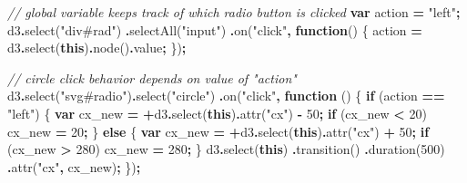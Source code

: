 \documentclass[
  openany]{book}
\newenvironment{Shaded}{\begin{snugshade}}{\end{snugshade}}
\newcommand{\AttributeTok}[1]{\textcolor[rgb]{0.77,0.63,0.00}{#1}}
\newcommand{\CommentTok}[1]{\textcolor[rgb]{0.56,0.35,0.01}{\textit{#1}}}
\newcommand{\ControlFlowTok}[1]{\textcolor[rgb]{0.13,0.29,0.53}{\textbf{#1}}}
\newcommand{\DecValTok}[1]{\textcolor[rgb]{0.00,0.00,0.81}{#1}}
\newcommand{\FunctionTok}[1]{\textcolor[rgb]{0.00,0.00,0.00}{#1}}
\newcommand{\KeywordTok}[1]{\textcolor[rgb]{0.13,0.29,0.53}{\textbf{#1}}}
\newcommand{\NormalTok}[1]{#1}
\newcommand{\OperatorTok}[1]{\textcolor[rgb]{0.81,0.36,0.00}{\textbf{#1}}}
\newcommand{\StringTok}[1]{\textcolor[rgb]{0.31,0.60,0.02}{#1}}
\begin{document}
\begin{Shaded}
\begin{Highlighting}[]
\CommentTok{// global variable keeps track of which radio button is clicked}
\KeywordTok{var}\NormalTok{ action }\OperatorTok{=} \StringTok{"left"}\OperatorTok{;}
\NormalTok{d3}\OperatorTok{.}\FunctionTok{select}\NormalTok{(}\StringTok{"div\#rad"}\NormalTok{)}
  \OperatorTok{.}\FunctionTok{selectAll}\NormalTok{(}\StringTok{"input"}\NormalTok{)}
  \OperatorTok{.}\FunctionTok{on}\NormalTok{(}\StringTok{"click"}\OperatorTok{,} \KeywordTok{function}\NormalTok{() \{ action }\OperatorTok{=}\NormalTok{ d3}\OperatorTok{.}\FunctionTok{select}\NormalTok{(}\KeywordTok{this}\NormalTok{)}\OperatorTok{.}\FunctionTok{node}\NormalTok{()}\OperatorTok{.}\AttributeTok{value}\OperatorTok{;}\NormalTok{ \})}\OperatorTok{;}
      
\CommentTok{// circle click behavior depends on value of "action"}
\NormalTok{d3}\OperatorTok{.}\FunctionTok{select}\NormalTok{(}\StringTok{"svg\#radio"}\NormalTok{)}\OperatorTok{.}\FunctionTok{select}\NormalTok{(}\StringTok{"circle"}\NormalTok{)}
  \OperatorTok{.}\FunctionTok{on}\NormalTok{(}\StringTok{"click"}\OperatorTok{,} \KeywordTok{function}\NormalTok{ () \{}
    \ControlFlowTok{if}\NormalTok{ (action }\OperatorTok{==} \StringTok{"left"}\NormalTok{) \{}
      \KeywordTok{var}\NormalTok{ cx\_new }\OperatorTok{=} \OperatorTok{+}\NormalTok{d3}\OperatorTok{.}\FunctionTok{select}\NormalTok{(}\KeywordTok{this}\NormalTok{)}\OperatorTok{.}\FunctionTok{attr}\NormalTok{(}\StringTok{"cx"}\NormalTok{) }\OperatorTok{{-}} \DecValTok{50}\OperatorTok{;}
      \ControlFlowTok{if}\NormalTok{ (cx\_new }\OperatorTok{\textless{}} \DecValTok{20}\NormalTok{) cx\_new }\OperatorTok{=} \DecValTok{20}\OperatorTok{;}
\NormalTok{      \} }\ControlFlowTok{else}\NormalTok{ \{}
      \KeywordTok{var}\NormalTok{ cx\_new }\OperatorTok{=} \OperatorTok{+}\NormalTok{d3}\OperatorTok{.}\FunctionTok{select}\NormalTok{(}\KeywordTok{this}\NormalTok{)}\OperatorTok{.}\FunctionTok{attr}\NormalTok{(}\StringTok{"cx"}\NormalTok{) }\OperatorTok{+} \DecValTok{50}\OperatorTok{;}
      \ControlFlowTok{if}\NormalTok{ (cx\_new }\OperatorTok{\textgreater{}} \DecValTok{280}\NormalTok{) cx\_new }\OperatorTok{=} \DecValTok{280}\OperatorTok{;}
\NormalTok{      \}}
\NormalTok{    d3}\OperatorTok{.}\FunctionTok{select}\NormalTok{(}\KeywordTok{this}\NormalTok{)}
      \OperatorTok{.}\FunctionTok{transition}\NormalTok{()}
      \OperatorTok{.}\FunctionTok{duration}\NormalTok{(}\DecValTok{500}\NormalTok{)}
      \OperatorTok{.}\FunctionTok{attr}\NormalTok{(}\StringTok{"cx"}\OperatorTok{,}\NormalTok{ cx\_new)}\OperatorTok{;}
\NormalTok{      \})}\OperatorTok{;}
\end{Highlighting}
\end{Shaded}
\end{document}
